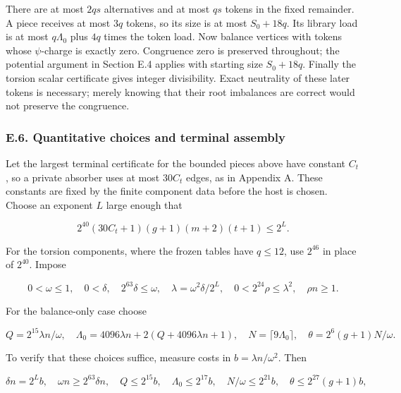 \documentclass[english,11pt,a4paper]{article}
\begin{document}
There are at most \(2qs\) alternatives and at most \(qs\) tokens in the fixed remainder. A piece receives at most \(3q\) tokens, so its size is at most \(S_0+18q\). Its library load is at most \(q\Lambda_0\) plus \(4q\) times the token load. Now balance vertices with tokens whose \(\psi\)-charge is exactly zero. Congruence zero is preserved throughout; the potential argument in Section E.4 applies with starting size \(S_0+18q\). Finally the torsion scalar certificate gives integer divisibility. Exact neutrality of these later tokens is necessary; merely knowing that their root imbalances are correct would not preserve the congruence.

\subsubsection{E.6. Quantitative choices and terminal assembly}\label{e.6.-quantitative-choices-and-terminal-assembly}

Let the largest terminal certificate for the bounded pieces above have constant \(C_t\), so a private absorber uses at most \(30C_t\) edges, as in Appendix A. These constants are fixed by the finite component data before the host is chosen. Choose an exponent \(L\) large enough that

\[2^{40}(30C_t+1)(g+1)(m+2)(t+1)\le2^L.
\tag{E.6.1}\]

For the torsion components, where the frozen tables have \(q\le12\), use \(2^{46}\) in place of \(2^{40}\). Impose

\[0<\omega\le1,\quad 0<\delta,\quad2^{63}\delta\le\omega,\quad
\lambda=\omega^2\delta/2^L,\quad
0<2^{24}\rho\le\lambda^2,\quad\rho n\ge1.
\tag{E.6.2}\]

For the balance-only case choose

\[Q=2^{15}\lambda n/\omega,\quad
\Lambda_0=4096\lambda n+2(Q+4096\lambda n+1),\quad
N=\lceil9\Lambda_0\rceil,\quad
\theta=2^6(g+1)N/\omega.
\tag{E.6.3}\]

To verify that these choices suffice, measure costs in \(b=\lambda n/\omega^2\). Then

\[\delta n=2^Lb,\quad \omega n\ge2^{63}\delta n,\quad
Q\le2^{15}b,\quad \Lambda_0\le2^{17}b,\quad
N/\omega\le2^{21}b,\quad\theta\le2^{27}(g+1)b,
\tag{E.6.4}\]
\end{document}
